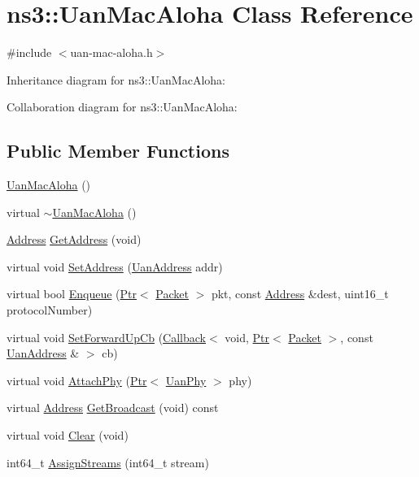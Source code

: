 \hypertarget{classns3_1_1UanMacAloha}{}\section{ns3\+:\+:Uan\+Mac\+Aloha Class Reference}
\label{classns3_1_1UanMacAloha}


{\ttfamily \#include $<$uan-\/mac-\/aloha.\+h$>$}



Inheritance diagram for ns3\+:\+:Uan\+Mac\+Aloha\+:


Collaboration diagram for ns3\+:\+:Uan\+Mac\+Aloha\+:
\subsection*{Public Member Functions}
\begin{DoxyCompactItemize}
\item 
\hyperlink{classns3_1_1UanMacAloha_a8a5a1d8aa61b27a6173cfec691d38c39}{Uan\+Mac\+Aloha} ()
\item 
virtual \hyperlink{classns3_1_1UanMacAloha_a22184becb0a1ee88465f76c73e0044cf}{$\sim$\+Uan\+Mac\+Aloha} ()
\item 
\hyperlink{classns3_1_1Address}{Address} \hyperlink{classns3_1_1UanMacAloha_aa73b42ebb063d9f906a62bccbcb0885d}{Get\+Address} (void)
\item 
virtual void \hyperlink{classns3_1_1UanMacAloha_a7d58399c36747da8e02c62f38b6b2734}{Set\+Address} (\hyperlink{classns3_1_1UanAddress}{Uan\+Address} addr)
\item 
virtual bool \hyperlink{classns3_1_1UanMacAloha_ab30d34edfac4930ce5b1654655a608ab}{Enqueue} (\hyperlink{classns3_1_1Ptr}{Ptr}$<$ \hyperlink{classns3_1_1Packet}{Packet} $>$ pkt, const \hyperlink{classns3_1_1Address}{Address} \&dest, uint16\+\_\+t protocol\+Number)
\item 
virtual void \hyperlink{classns3_1_1UanMacAloha_a6844d9c87f85013360ada7654a078443}{Set\+Forward\+Up\+Cb} (\hyperlink{classns3_1_1Callback}{Callback}$<$ void, \hyperlink{classns3_1_1Ptr}{Ptr}$<$ \hyperlink{classns3_1_1Packet}{Packet} $>$, const \hyperlink{classns3_1_1UanAddress}{Uan\+Address} \& $>$ cb)
\item 
virtual void \hyperlink{classns3_1_1UanMacAloha_a7c0a0376782fb8537f93aa0505f86c28}{Attach\+Phy} (\hyperlink{classns3_1_1Ptr}{Ptr}$<$ \hyperlink{classns3_1_1UanPhy}{Uan\+Phy} $>$ phy)
\item 
virtual \hyperlink{classns3_1_1Address}{Address} \hyperlink{classns3_1_1UanMacAloha_ae25cc9149214d08f9a4a22b9a0f2f01f}{Get\+Broadcast} (void) const 
\item 
virtual void \hyperlink{classns3_1_1UanMacAloha_a561ad6335bd63538195a3a7da43a2413}{Clear} (void)
\item 
int64\+\_\+t \hyperlink{classns3_1_1UanMacAloha_a9a088f4e172195574e03c632e97646df}{Assign\+Streams} (int64\+\_\+t stream)
\end{DoxyCompactItemize}
